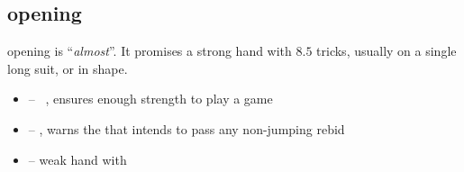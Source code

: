 \subsection{\ctr{2\protect\c} opening}
\label{subsec:2c-op}

\ctr{2\c} opening is ``\emph{almost}\gf''. It promises a strong hand with $8.5$ tricks, usually on a single long suit,
or  in \bal\/ shape. \vspace{1em}

\begin{itemize}
  \item \ctr{2\d} -- \art\ \gf, ensures enough strength to play a game
  \item \ctr{2\h} -- \neg, warns the \opn\/ that \resp\/ intends to pass any non-jumping rebid
  \item \ctr{2\s} -- weak hand with  \question
\end{itemize}

